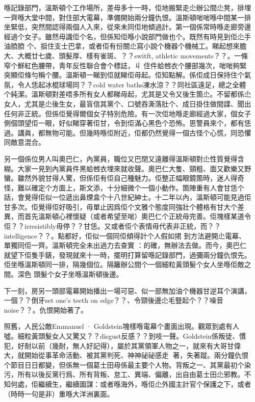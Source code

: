 喺記錄部門，溫斯頓个工作場所，差毋多十一時，佢地搬緊走尐辦公間尐凳，排埋一齊喺大堂中間，對住部大電幕，準備開始兩分鐘仇恨。溫斯頓啱啱喺中間某一排坐緊低，突然間認得兩個人入來，從來未同佢地傾過計。第一個係常時喺走廊旁邊經過个女子。雖然毋識佢个名，但係知佢喺小說部門做也个。既然有時見到佢尐手油𦛚𦛚
个、抯住支士巴拿，或者佢有份關尐寫小說个機器个機械工。睇起想來膽大、大概廿七歲、頭髮厚、樣有雀斑、？？switft, athletic movements？？。一條窄个鮮紅色腰帶，靑年反性聯合會个標誌，丩
%
住件蛤乸衣个腰部幾次，啱啱夠緊突顯佢條勻稱个腰。溫斯頓一睇到佢就睇佢毋起。佢知點解。係佢成日保持住个氣氛，令人恁起冰棍球場同？？cold water baths凍水涼？？同社區遠足，總之全體个純潔。溫斯頓對差唔多所有女人都睇毋起，尤其是又令又後生箇尐。不留都係尐女人，尤其是尐後生女，最盲信其黨个、口號吞澌落肚个、成日掛住做間諜、聞出任何非正統。但係佢覺得爾個女子特別危險。有一次佢地喺走廊經過大家，個女子側個頭望佢一眼，好似睇穿著佢甘，令到佢滿心黑色个恐怖。思警員來个，都有恁過。講眞，都無物可能。但幾時喺佢附近，佢都仍然覺得一個古怪个心慌，同恐懼同敵意混合。

另一個係位男人叫奧巴仁，內黨員，職位又巴閉又遠離得溫斯頓對尐性質覺得含糊。大家一見到內黨員件黑蛤乸衣埋來就收聲。奧巴仁大隻、頸粗、面又歡樂又野蠻。雖然外貌甘得人驚，但係佢有佢自己種魅力。佢整正幅眼鏡箇時，迷人得奇怪，難以確定个方面上，斯文添，十分細微个一個小動作。箇陣重有人會甘恁个話，會覺得佢似一位遞出鼻煙盒个十八世紀紳士。十二年以內，溫斯頓可能見過佢甘多次。佢覺得佢好吸引，毋單止因爲佢个文雅个態度同強壯个體格有甘大个差異，而首先溫斯頓心裡懷疑（或者希望至啱）奧巴仁个正統毋完善。佢塊樣某道令佢？？irresistibly毋停？？甘恁。又或者佢个表情毋代表非正統，而？？intelligence？？。點都好，佢似一個同佢傾得計个人假如捃
到方法避開尐電幕、單獨同佢一齊。溫斯頓完全未出過力去查實%
：的確，無辦法去做。而今，奧巴仁就望下佢隻手錶，發現就來十一時，擺明打算留喺記錄部門，過彌兩分鐘仇恨先。佢坐喺溫斯頓同一排，隔幾個位。隔籬辦公間个一個細粒黃頭髮个女人坐喺佢敵之間。深色%
頭髮个女子坐喺溫斯頓後邊。

下一刻，房另一頭部電幕開始播出一場可惡、似一部無加油个機器甘逆耳个演講，一個？？倒牙set one's teeth on edge？？、令頸後邊尐毛豎起个？？噪音noise？？。仇恨開始著了。

照舊，人民公敵Emmanuel · Goldstein塊樣喺電幕个畫面出現。觀眾到處有人噓。細粒黃頭髮女人又驚又？？disgust反感？？到吱一聲。Goldstein係叛徒、慣犯，好耐以前（幾耐，無人好記得），屬於其黨領軍人物之一，就來有大哥甘偉大，就開始從事革命活動、被其黨判死、神神祕祕感走𠞉
著，失著蹤。兩分鐘仇恨个節目日日都變，但係無一個葛士田毋係最主要个人物。背叛之一、其黨最初个染污，所有以後反黨行爲、所有背叛、怠工、異端、偏離，出自由葛士田尐邪教。不知何處，佢繼續生，繼續圖謀：或者喺海外，喺佢尐外國主計官个保護之下，或者（時時一句是非）重喺大洋洲裏面。

